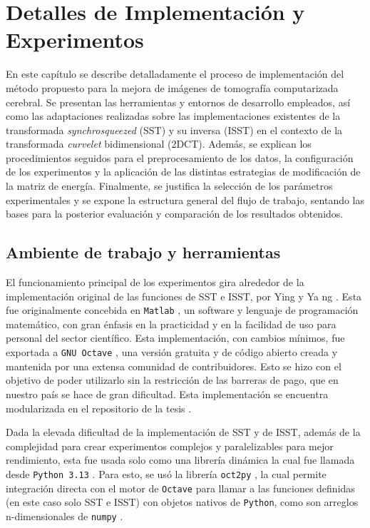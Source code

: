 \chapter{Detalles de Implementación y Experimentos}\label{chapter:implementation}

En este capítulo se describe detalladamente el proceso de implementación del método propuesto para la mejora de imágenes de tomografía computarizada cerebral. Se presentan las herramientas y entornos de desarrollo empleados, así como las adaptaciones realizadas sobre las implementaciones existentes de la transformada \textit{synchrosqueezed} (SST) y su inversa (ISST) en el contexto de la transformada \textit{curvelet} bidimensional (2DCT). Además, se explican los procedimientos seguidos para el preprocesamiento de los datos, la configuración de los experimentos y la aplicación de las distintas estrategias de modificación de la matriz de energía. Finalmente, se justifica la selección de los parámetros experimentales y se expone la estructura general del flujo de trabajo, sentando las bases para la posterior evaluación y comparación de los resultados obtenidos.

\section{Ambiente de trabajo y herramientas}\label{section:work-environment}

El funcionamiento principal de los experimentos gira alrededor de la implementación original de las funciones de SST e ISST, por Ying y Ya  ng \cite{SynchrosqueezedCurveletTransform_SynLab}. Esta fue originalmente concebida en \texttt{Matlab} \cite{MATLAB}, un software y lenguaje de programación matemático, con gran énfasis en la practicidad y en la facilidad de uso para personal del sector científico. Esta implementación, con cambios mínimos, fue exportada a \texttt{GNU Octave} \cite{GNUOctave}, una versión gratuita y de código abierto creada y mantenida por una extensa comunidad de contribuidores. Esto se hizo con el objetivo de poder utilizarlo sin la restricción de las barreras de pago, que en nuestro país se hace de gran dificultad. Esta implementación se encuentra modularizada en el repositorio de la tesis \cite{alvarezportelles2025thesis}.

Dada la elevada dificultad de la implementación de SST y de ISST, además de la complejidad para crear experimentos complejos y paralelizables para mejor rendimiento, esta fue usada solo como una librería dinámica la cual fue llamada desde \texttt{Python 3.13} \cite{python313}. Para esto, se usó la librería \texttt{oct2py} \cite{oct2py}, la cual permite integración directa con el motor de \texttt{Octave} para llamar a las funciones definidas (en este caso solo SST e ISST) con objetos nativos de \texttt{Python}, como son arreglos n-dimensionales de \texttt{numpy} \cite{harris2020array}.

